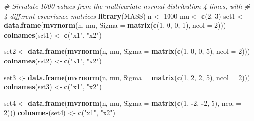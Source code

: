 \documentclass[
]{article}
\newenvironment{Shaded}{\begin{snugshade}}{\end{snugshade}}
\newcommand{\AttributeTok}[1]{\textcolor[rgb]{0.13,0.29,0.53}{#1}}
\newcommand{\CommentTok}[1]{\textcolor[rgb]{0.56,0.35,0.01}{\textit{#1}}}
\newcommand{\DecValTok}[1]{\textcolor[rgb]{0.00,0.00,0.81}{#1}}
\newcommand{\FunctionTok}[1]{\textcolor[rgb]{0.13,0.29,0.53}{\textbf{#1}}}
\newcommand{\NormalTok}[1]{#1}
\newcommand{\OtherTok}[1]{\textcolor[rgb]{0.56,0.35,0.01}{#1}}
\newcommand{\SpecialCharTok}[1]{\textcolor[rgb]{0.81,0.36,0.00}{\textbf{#1}}}
\newcommand{\StringTok}[1]{\textcolor[rgb]{0.31,0.60,0.02}{#1}}
\begin{document}
\begin{Shaded}
\begin{Highlighting}[]
\CommentTok{\# Simulate 1000 values from the multivariate normal distribution 4 times, with }
\CommentTok{\# 4 different covariance matrices}
\FunctionTok{library}\NormalTok{(MASS)}
\NormalTok{n }\OtherTok{\textless{}{-}} \DecValTok{1000}
\NormalTok{mu }\OtherTok{\textless{}{-}} \FunctionTok{c}\NormalTok{(}\DecValTok{2}\NormalTok{, }\DecValTok{3}\NormalTok{)}
\NormalTok{set1 }\OtherTok{\textless{}{-}} \FunctionTok{data.frame}\NormalTok{(}\FunctionTok{mvrnorm}\NormalTok{(n, mu, }\AttributeTok{Sigma =} \FunctionTok{matrix}\NormalTok{(}\FunctionTok{c}\NormalTok{(}\DecValTok{1}\NormalTok{, }\DecValTok{0}\NormalTok{, }\DecValTok{0}\NormalTok{, }\DecValTok{1}\NormalTok{), }\AttributeTok{ncol =} \DecValTok{2}\NormalTok{)))}
\FunctionTok{colnames}\NormalTok{(set1) }\OtherTok{\textless{}{-}} \FunctionTok{c}\NormalTok{(}\StringTok{"x1"}\NormalTok{, }\StringTok{"x2"}\NormalTok{)}

\NormalTok{set2 }\OtherTok{\textless{}{-}} \FunctionTok{data.frame}\NormalTok{(}\FunctionTok{mvrnorm}\NormalTok{(n, mu, }\AttributeTok{Sigma =} \FunctionTok{matrix}\NormalTok{(}\FunctionTok{c}\NormalTok{(}\DecValTok{1}\NormalTok{, }\DecValTok{0}\NormalTok{, }\DecValTok{0}\NormalTok{, }\DecValTok{5}\NormalTok{), }\AttributeTok{ncol =} \DecValTok{2}\NormalTok{)))}
\FunctionTok{colnames}\NormalTok{(set2) }\OtherTok{\textless{}{-}} \FunctionTok{c}\NormalTok{(}\StringTok{"x1"}\NormalTok{, }\StringTok{"x2"}\NormalTok{)}

\NormalTok{set3 }\OtherTok{\textless{}{-}} \FunctionTok{data.frame}\NormalTok{(}\FunctionTok{mvrnorm}\NormalTok{(n, mu, }\AttributeTok{Sigma =} \FunctionTok{matrix}\NormalTok{(}\FunctionTok{c}\NormalTok{(}\DecValTok{1}\NormalTok{, }\DecValTok{2}\NormalTok{, }\DecValTok{2}\NormalTok{, }\DecValTok{5}\NormalTok{), }\AttributeTok{ncol =} \DecValTok{2}\NormalTok{)))}
\FunctionTok{colnames}\NormalTok{(set3) }\OtherTok{\textless{}{-}} \FunctionTok{c}\NormalTok{(}\StringTok{"x1"}\NormalTok{, }\StringTok{"x2"}\NormalTok{)}

\NormalTok{set4 }\OtherTok{\textless{}{-}} \FunctionTok{data.frame}\NormalTok{(}\FunctionTok{mvrnorm}\NormalTok{(n, mu, }\AttributeTok{Sigma =} \FunctionTok{matrix}\NormalTok{(}\FunctionTok{c}\NormalTok{(}\DecValTok{1}\NormalTok{, }\SpecialCharTok{{-}}\DecValTok{2}\NormalTok{, }\SpecialCharTok{{-}}\DecValTok{2}\NormalTok{, }\DecValTok{5}\NormalTok{), }\AttributeTok{ncol =} \DecValTok{2}\NormalTok{)))}
\FunctionTok{colnames}\NormalTok{(set4) }\OtherTok{\textless{}{-}} \FunctionTok{c}\NormalTok{(}\StringTok{"x1"}\NormalTok{, }\StringTok{"x2"}\NormalTok{)}
\end{Highlighting}
\end{Shaded}
\end{document}
